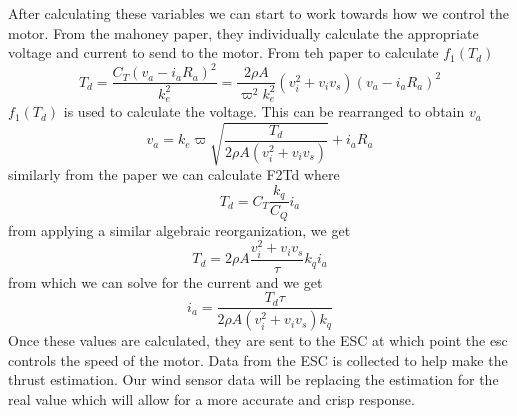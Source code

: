 \documentclass{article}
\begin{document}
After calculating these variables we can start to work towards how we control the motor. From the mahoney paper, they individually calculate the appropriate voltage and current to send to the motor. From teh paper to calculate $f_{1}(T_{d})$
\begin{equation}
T_{d} = \frac{C_{T}(v_{a} - i_{a}R_{a})^2}{k_{e}^2}
 = \frac{2 \rho A}{\varpi ^2 k^2_{e}}(v^2_{i} + v_{i}v_{s})(v_{a} - i_{a}R_{a})^2
\end{equation}
$f_{1}(T_{d})$ is used to calculate the voltage. This can be rearranged to obtain $v_{a}$
\begin{equation}
v_{a} = k_{e} \varpi \sqrt{\frac{T_{d}}{2 \rho A (v_{i}^2 + v_{i}v_{s})}} + i_{a}R_{a}
\end{equation}
similarly from the paper we can calculate F2Td where 
\begin{equation}
T_{d} = C_{T} \frac{k_{q}}{C_{Q}}i_{a}
\end{equation}
from applying a similar algebraic reorganization, we get 
\begin{equation}
T_{d} = 2 \rho A \frac{v_{i}^2 + v_{i}v_{s}}{\tau} k_{q}i_a
\end{equation}
from which we can solve for the current and we get
\begin{equation}
i_a = \frac{T_d \tau}{2 \rho A (v_i^2 + v_i v_s) k_q}
\end{equation}
Once these values are calculated, they are sent to the ESC at which point the esc controls the speed of the motor. 
Data from the ESC is collected to help make the thrust estimation. 
Our wind sensor data will be replacing the estimation for the real value which will allow for a more accurate and crisp response.
\end{document}
